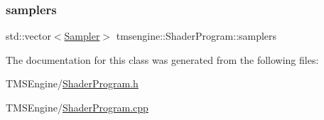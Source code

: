 \mbox{\label{classtmsengine_1_1_shader_program_a3f32e04874a593207c3e2fe5aaef2e5e}} 
\subsubsection{\texorpdfstring{samplers}{samplers}}
{\footnotesize\ttfamily std\+::vector$<$\hyperlink{structtmsengine_1_1_sampler}{Sampler}$>$ tmsengine\+::\+Shader\+Program\+::samplers\hspace{0.3cm}{\ttfamily [private]}}



The documentation for this class was generated from the following files\+:\begin{DoxyCompactItemize}
\item 
T\+M\+S\+Engine/\hyperlink{_shader_program_8h}{Shader\+Program.\+h}\item 
T\+M\+S\+Engine/\hyperlink{_shader_program_8cpp}{Shader\+Program.\+cpp}\end{DoxyCompactItemize}
